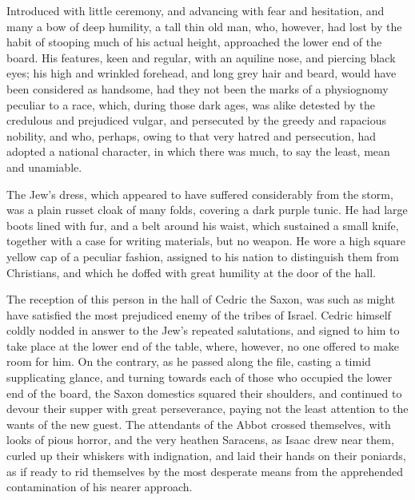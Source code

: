 Introduced with little ceremony, and advancing with fear and hesitation,
and many a bow of deep humility, a tall thin old man, who, however, had
lost by the habit of stooping much of his actual height, approached the
lower end of the board. His features, keen and regular, with an aquiline
nose, and piercing black eyes; his high and wrinkled forehead, and long
grey hair and beard, would have been considered as handsome, had they
not been the marks of a physiognomy peculiar to a race, which, during
those dark ages, was alike detested by the credulous and prejudiced
vulgar, and persecuted by the greedy and rapacious nobility, and who,
perhaps, owing to that very hatred and persecution, had adopted a
national character, in which there was much, to say the least, mean and
unamiable.

The Jew's dress, which appeared to have suffered considerably from the
storm, was a plain russet cloak of many folds, covering a dark purple
tunic. He had large boots lined with fur, and a belt around his waist,
which sustained a small knife, together with a case for writing
materials, but no weapon. He wore a high square yellow cap of a peculiar
fashion, assigned to his nation to distinguish them from Christians, and
which he doffed with great humility at the door of the hall.

The reception of this person in the hall of Cedric the Saxon, was such
as might have satisfied the most prejudiced enemy of the tribes of
Israel. Cedric himself coldly nodded in answer to the Jew's repeated
salutations, and signed to him to take place at the lower end of the
table, where, however, no one offered to make room for him. On the
contrary, as he passed along the file, casting a timid supplicating
glance, and turning towards each of those who occupied the lower end of
the board, the Saxon domestics squared their shoulders, and continued to
devour their supper with great perseverance, paying not the least
attention to the wants of the new guest. The attendants of the Abbot
crossed themselves, with looks of pious horror, and the very heathen
Saracens, as Isaac drew near them, curled up their whiskers with
indignation, and laid their hands on their poniards, as if ready to rid
themselves by the most desperate means from the apprehended
contamination of his nearer approach.


